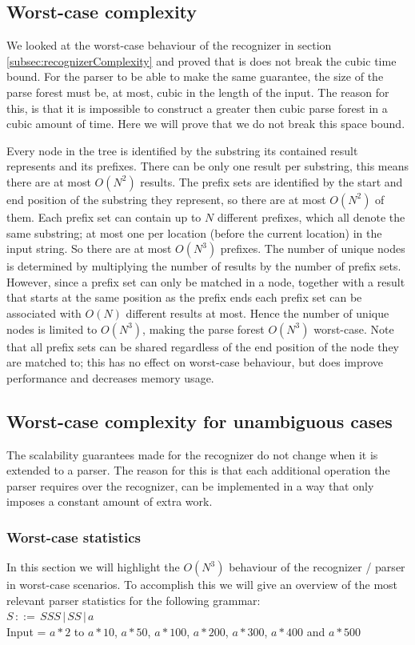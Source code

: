 \documentclass[a4paper,10pt]{article}
\begin{document}
\subsection{Worst-case complexity}

We looked at the worst-case behaviour of the recognizer in section \ref{subsec:recognizerComplexity} and proved that is does not break the cubic time bound. For the parser to be able to make the same guarantee, the size of the parse forest must be, at most, cubic in the length of the input. The reason for this, is that it is impossible to construct a greater then cubic parse forest in a cubic amount of time. Here we will prove that we do not break this space bound.

Every node in the tree is identified by the substring its contained result represents and its prefixes. There can be only one result per substring, this means there are at most $O(N^2)$ results. The prefix sets are identified by the start and end position of the substring they represent, so there are at most $O(N^2)$ of them. Each prefix set can contain up to $N$ different prefixes, which all denote the same substring; at most one per location (before the current location) in the input string. So there are at most $O(N^3)$ prefixes. The number of unique nodes is determined by multiplying the number of results by the number of prefix sets. However, since a prefix set can only be matched in a node, together with a result that starts at the same position as the prefix ends each prefix set can be associated with $O(N)$ different results at most. Hence the number of unique nodes is limited to $O(N^3)$, making the parse forest $O(N^3)$ worst-case. Note that all prefix sets can be shared regardless of the end position of the node they are matched to; this has no effect on worst-case behaviour, but does improve performance and decreases memory usage.

\subsection{Worst-case complexity for unambiguous cases}

The scalability guarantees made for the recognizer do not change when it is extended to a parser. The reason for this is that each additional operation the parser requires over the recognizer, can be implemented in a way that only imposes a constant amount of extra work.

\subsubsection{Worst-case statistics}
In this section we will highlight the $O(N^3)$ behaviour of the recognizer / parser in worst-case scenarios. To accomplish this we will give an overview of the most relevant parser statistics for the following grammar:\\
$S\,::=\,SSS\,|\,SS\,|\,a$\\
Input = $a * 2$ to $a * 10$, $a * 50$, $a * 100$, $a * 200$, $a * 300$, $a * 400$ and $a * 500$
\end{document}
